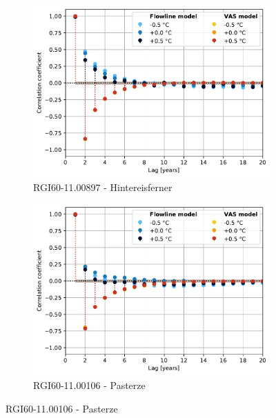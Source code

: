\begin{figure}[htp]
        \begin{subfigure}[b]{0.48\textwidth}
          \caption{RGI60-11.00897 - Hintereisferner}
          \label{fig:pacf:hintereisferner}
          \centering
          \includegraphics[width=\textwidth]{../plots/final_plots/pacf/Hintereisferner.pdf}
        \end{subfigure}
        \hfill
        \begin{subfigure}[b]{0.48\textwidth}
          \caption{RGI60-11.00106 - Pasterze}
          \label{fig:pacf:pasterze}
          \centering
          \includegraphics[width=\textwidth]{../plots/final_plots/pacf/Pasterze.pdf}
        \end{subfigure}


\end{figure}

